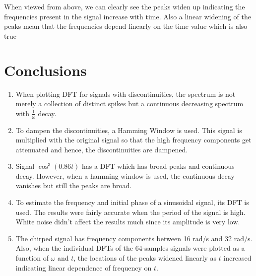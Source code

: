 \documentclass[12pt, a4paper]{article}
\begin{document}
\begin{center}
    When viewed from above, we can clearly see the peaks widen up indicating the frequencies present in the signal increase with time. Also a linear widening of the peaks mean that the frequencies depend linearly on the time value which is also true
\end{center}
\section{Conclusions}
\begin{enumerate}
    \item When plotting DFT for signals with discontinuities, the spectrum is not
    merely a collection of distinct spikes but a continuous decreasing spectrum
    with $\frac{1}{\omega}$ decay.
    \item To dampen the discontinuities, a Hamming Window is used. This signal is
    multiplied with the original signal so that the high frequency components
    get attenuated and hence, the discontinuities are dampened.
    \item Signal $\cos^{3}(0.86t)$ has a DFT which has broad peaks and continuous decay.
    However, when a hamming window is used, the continuous decay vanishes
    but still the peaks are broad.
    \item To estimate the frequency and initial phase of a sinusoidal signal, its DFT
    is used. The results were fairly accurate when the period of the signal
    is high. White noise didn't affect the results much since its amplitude is
    very low.
    \item The chirped signal has frequency components between 16 rad/s and 32
    rad/s. Also, when the individual DFTs of the 64-samples signals were
    plotted as a function of $\omega$ and $t$, the locations of the peaks widened linearly
    as $t$ increased indicating linear dependence of frequency on $t$.
\end{enumerate}
\end{document}
